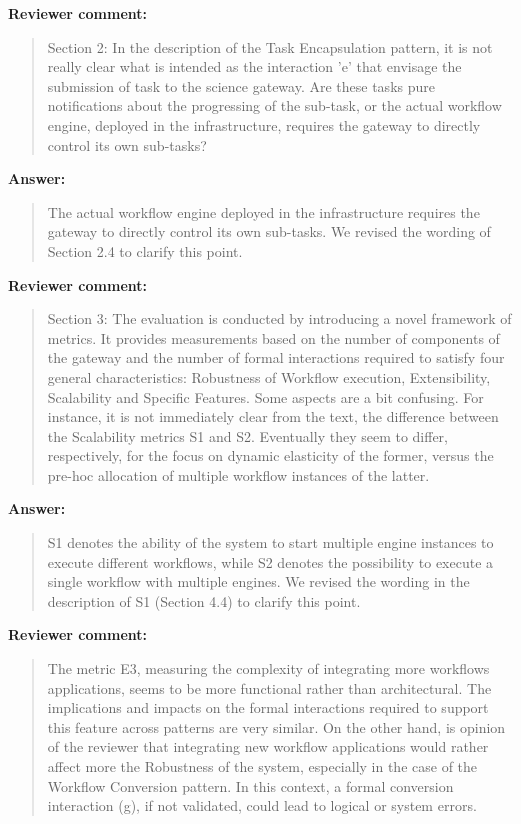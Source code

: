 \documentclass[a4]{article}
\newenvironment{review}%
{\textbf{Reviewer comment:}\begin{quote}}%
{\end{quote}}%
\newenvironment{answer}%
{\textbf{Answer:}\begin{small}\begin{quote}}%
{\end{quote}\end{small}}%
\begin{document}
\begin{review}
  Section 2: In the description of the Task Encapsulation pattern, it
  is not really clear what is intended as the interaction 'e' that
  envisage the submission of task to the science gateway. Are these
  tasks pure notifications about the progressing of the sub-task, or
  the actual workflow engine, deployed in the infrastructure, requires
  the gateway to directly control its own sub-tasks?
\end{review}

\begin{answer}
  The actual workflow engine deployed in the infrastructure
  requires the gateway to directly control its own sub-tasks. We
  revised the wording of Section 2.4 to clarify this point.
\end{answer}

\begin{review}
  Section 3: The evaluation is conducted by introducing a novel
  framework of metrics. It provides measurements based on the number
  of components of the gateway and the number of formal interactions
  required to satisfy four general characteristics: Robustness of
  Workflow execution, Extensibility, Scalability and Specific
  Features. Some aspects are a bit confusing. For instance, it is not
  immediately clear from the text, the difference between the
  Scalability metrics S1 and S2. Eventually they seem to differ,
  respectively, for the focus on dynamic elasticity of the former,
  versus the pre-hoc allocation of multiple workflow instances of the
  latter.
\end{review}

\begin{answer}
  S1 denotes the ability of the system to start multiple engine
  instances to execute different workflows, while S2 denotes the
  possibility to execute a single workflow with multiple engines. We
  revised the wording in the description of S1 (Section 4.4) to clarify
  this point.
\end{answer}

\begin{review}
The metric E3, measuring the complexity of integrating more workflows applications, seems to be more functional rather than architectural. The implications and impacts on the formal interactions required to support this feature across patterns are very similar.
 On the other hand, is opinion of the reviewer that integrating new workflow applications would rather affect more the Robustness of the system, especially in the case of the Workflow Conversion pattern. In this context, a formal conversion interaction (g), if not validated, could lead to logical or system errors.
\end{review}
\end{document}
